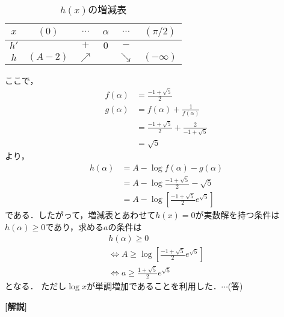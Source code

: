 \documentclass[a4paper,10pt]{ltjsarticle}
\begin{document}
\begin{multicols}{2}
  \begin{table}[H]
    \centering
    \caption{$h(x)$の増減表}
    \label{table:1}
    \begin{tabular}{|c||c|c|c|c|c|}
      \hline
      $x$  & $(0)$   & $\cdots$   & $\alpha$ & $\cdots$   & $(\pi/2)$   \\
      \hline
      $h'$ &         & $+$        & $0$      & $-$        &             \\
      \hline
      $h$  & $(A-2)$ & $\nearrow$ &          & $\searrow$ & $(-\infty)$ \\
      \hline
    \end{tabular}
  \end{table}
  ここで，
  \begin{align*}
    f(\alpha)
     & = \frac{-1+\sqrt{5}}{2}                         \\
    g(\alpha)
     & = f(\alpha) + \frac{1}{f(\alpha)}               \\
     & = \frac{-1+\sqrt{5}}{2} + \frac{2}{-1+\sqrt{5}} \\
     & = \sqrt{5}
  \end{align*}
  より，
  \begin{align*}
    h(\alpha)
     & = A - \log f(\alpha) - g(\alpha)                           \\
     & = A - \log \frac{-1+\sqrt{5}}{2} - \sqrt{5}                \\
     & = A - \log \left[\frac{-1+\sqrt{5}}{2} e^{\sqrt{5}}\right]
  \end{align*}
  である．したがって，増減表とあわせて$h(x)=0$が実数解を持つ条件は
  $h(\alpha)\ge 0$であり，求める$a$の条件は
  \begin{align*}
    h(\alpha) \ge 0                                            \\
    \iff
    A \ge \log \left[\frac{-1+\sqrt{5}}{2} e^{\sqrt{5}}\right] \\
    \iff
    a \ge \frac{1+\sqrt{5}}{2} e^{\sqrt{5}}
  \end{align*}
  となる．
  ただし$\log x$が単調増加であることを利用した．$\cdots$(答)

  \vspace{10pt}
  {\bf[解説]}

  \newpage
\end{multicols}
\end{document}
